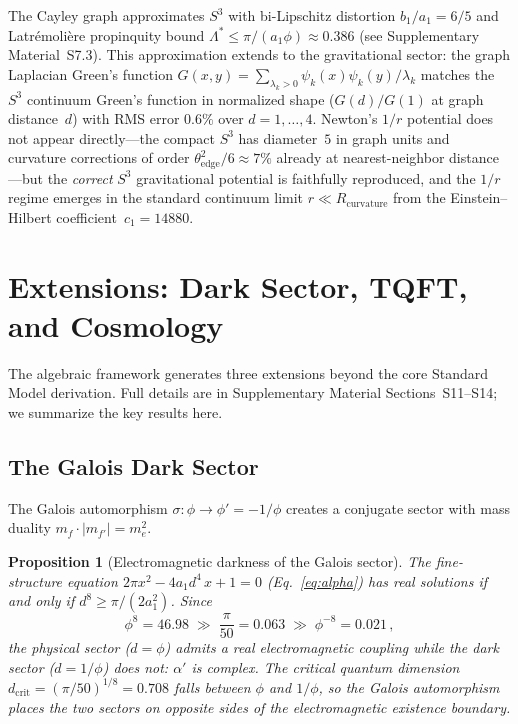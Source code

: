 \documentclass[12pt,a4paper]{article}
\newtheorem{proposition}{Proposition}
\theoremstyle{definition}
\begin{document}
The Cayley graph approximates $S^3$ with bi-Lipschitz distortion $b_1/a_1 = 6/5$ and Latr\'emoli\`ere propinquity bound $\Lambda^* \leq \pi/(a_1\phi) \approx 0.386$ (see Supplementary Material~S7.3).  This approximation extends to the gravitational sector: the graph Laplacian Green's function $G(x,y) = \sum_{\lambda_k > 0} \psi_k(x)\psi_k(y)/\lambda_k$ matches the $S^3$ continuum Green's function in normalized shape ($G(d)/G(1)$ at graph distance~$d$) with RMS error $0.6\%$ over $d = 1, \ldots, 4$.  Newton's $1/r$ potential does not appear directly---the compact $S^3$ has diameter~$5$ in graph units and curvature corrections of order $\theta_{\mathrm{edge}}^2/6 \approx 7\%$ already at nearest-neighbor distance---but the \emph{correct} $S^3$ gravitational potential is faithfully reproduced, and the $1/r$ regime emerges in the standard continuum limit $r \ll R_{\mathrm{curvature}}$ from the Einstein--Hilbert coefficient~$c_1 = 14880$.


\section{Extensions: Dark Sector, TQFT, and Cosmology}
\label{sec:extensions}

The algebraic framework generates three extensions beyond the core Standard Model derivation.  Full details are in Supplementary Material Sections~S11--S14; we summarize the key results here.

\subsection{The Galois Dark Sector}
\label{sec:dark}

The Galois automorphism $\sigma: \phi \to \phi' = -1/\phi$ creates a conjugate sector with mass duality $m_f \cdot |m_{f'}| = m_e^2$.

\begin{proposition}[Electromagnetic darkness of the Galois sector]
\label{prop:dark_alpha}
The fine-structure equation $2\pi x^2 - 4a_1 d^4\, x + 1 = 0$ (Eq.~\ref{eq:alpha}) has real solutions if and only if $d^8 \geq \pi/(2a_1^2)$.  Since
\[
\phi^8 = 46.98 \;\gg\; \frac{\pi}{50} = 0.063 \;\gg\; \phi^{-8} = 0.021\,,
\]
the physical sector ($d = \phi$) admits a real electromagnetic coupling while the dark sector ($d = 1/\phi$) does not: $\alpha'$ is complex.  The critical quantum dimension $d_{\mathrm{crit}} = (\pi/50)^{1/8} = 0.708$ falls between $\phi$ and $1/\phi$, so the Galois automorphism places the two sectors on opposite sides of the electromagnetic existence boundary.
\end{proposition}
\end{document}
